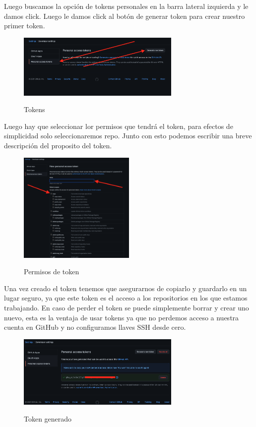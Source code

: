 \documentclass[11pt, oneside]{article}
\begin{document}
Luego buscamos la opción de tokens personales en la barra lateral izquierda y le damos click. Luego le damos click al botón de generar token para crear nuestro primer token.

\begin{figure}[H]
  \centering
  \caption{Tokens}
  \includegraphics[width=0.70\textwidth]{./img/github-tokens-2.png}
  \label{fig:github-tokens-2}
\end{figure}

Luego hay que seleccionar lor permisos que tendrá el token, para efectos de simplicidad solo seleccionaremos repo. Junto con esto podemos escribir una breve descripción del proposito del token.

\begin{figure}[H]
  \centering
  \caption{Permisos de token}
  \includegraphics[width=0.50\textwidth]{./img/github-tokens-3.png}
  \label{fig:github-tokens-3}
\end{figure}

Una vez creado el token tenemos que asegurarnos de copiarlo y guardarlo en un lugar seguro, ya que este token es el acceso a los repositorios en los que estamos trabajando. En caso de perder el token se puede simplemente borrar y crear uno nuevo, esta es la ventaja de usar tokens ya que no perdemos acceso a nuestra cuenta en GitHub y no configuramos llaves SSH desde cero.

\begin{figure}[H]
  \centering
  \caption{Token generado}
  \includegraphics[width=0.70\textwidth]{./img/github-tokens-4.png}
  \label{fig:github-tokens-4}
\end{figure}
\end{document}
